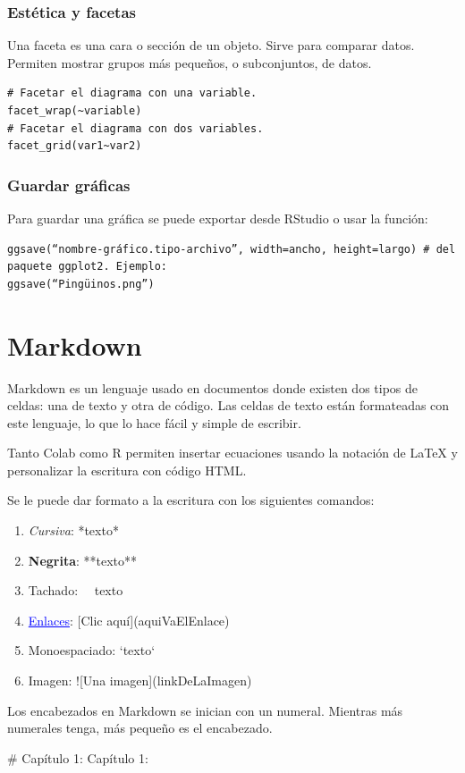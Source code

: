 \documentclass[a4paper, 12pt]{book}
\begin{document}
\subsection{Estética y facetas}
Una faceta es una cara o sección de un objeto. Sirve para comparar datos. Permiten mostrar grupos más pequeños, o subconjuntos, de datos.
\begin{verbatim}
# Facetar el diagrama con una variable.
facet_wrap(~variable)
# Facetar el diagrama con dos variables.
facet_grid(var1~var2)
\end{verbatim}
\subsection{Guardar gráficas}
Para guardar una gráfica se puede exportar desde RStudio o usar la función:
\begin{verbatim} 
ggsave(“nombre-gráfico.tipo-archivo”, width=ancho, height=largo) # del paquete ggplot2. Ejemplo:
ggsave(“Pingüinos.png”)
\end{verbatim}
%
\chapter{Markdown}
Markdown es un lenguaje usado en documentos donde existen dos tipos de celdas: una de texto y otra de código. Las celdas de texto están formateadas con este lenguaje, lo que lo hace fácil y simple de escribir.

Tanto Colab como R permiten insertar ecuaciones usando la notación de LaTeX y personalizar la escritura con código HTML.


Se le puede dar formato a la escritura con los siguientes comandos:
\begin{enumerate}
	\item \textit{Cursiva}: *texto*
	\item \textbf{Negrita}: **texto**
	\item Tachado: ~~texto~~
	\item \textcolor{blue}{\underline{Enlaces}}: [Clic aquí](aquiVaElEnlace)
	\item Monoespaciado: `texto`
	\item Imagen: ![Una imagen](linkDeLaImagen)
\end{enumerate}

Los encabezados en Markdown se inician con un numeral. Mientras más numerales tenga, más pequeño es el encabezado.

$\#$ Capítulo 1: {\LARGE Capítulo 1:}
\end{document}
